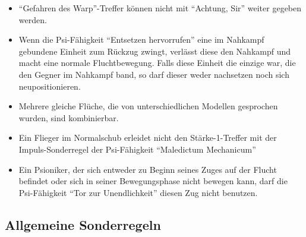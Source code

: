 \begin{itemize}

 \item ``Gefahren des Warp''-Treffer können nicht mit ``Achtung, Sir'' weiter
  gegeben werden.

 \item Wenn die Psi-Fähigkeit ``Entsetzen hervorrufen'' eine im Nahkampf gebundene
  Einheit zum Rückzug zwingt, verlässt diese den Nahkampf und macht eine normale
  Fluchtbewegung. Falls diese Einheit die einzige war, die den Gegner im Nahkampf
  band, so darf dieser weder nachsetzen noch sich neupositionieren.

 \item Mehrere gleiche Flüche, die von unterschiedlichen Modellen gesprochen
  wurden, sind kombinierbar.

 \item Ein Flieger im Normalschub erleidet nicht den Stärke-1-Treffer mit der
  Impuls-Sonderregel der Psi-Fähigkeit ``Maledictum Mechanicum''

 \item Ein Psioniker, der sich entweder zu Beginn seines Zuges auf der Flucht
  befindet oder sich in seiner Bewegungsphase nicht bewegen kann, darf die
  Psi-Fähigkeit ``Tor zur Unendlichkeit'' diesen Zug nicht benutzen.

\end{itemize}

\subsection{Allgemeine Sonderregeln}

